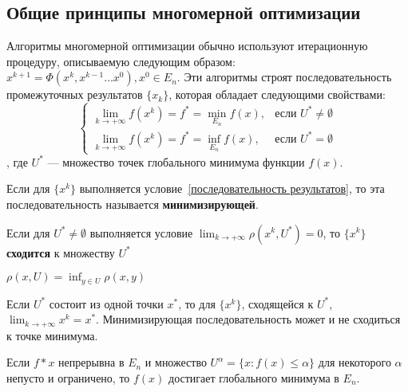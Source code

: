 \subsection{Общие принципы многомерной оптимизации}

Алгоритмы многомерной оптимизации обычно используют итерационную процедуру, описываемую следующим образом: \(x^{k + 1} = \Phi(x^k, x^{k - 1} \dots x^0), x^0 \in E_n\). Эти алгоритмы строят последовательность промежуточных результатов \(\{x_k\}\), которая обладает следующими свойствами:
\begin{equation}
    \begin{cases}
        \lim\limits_{k \to +\infty} f(x^k) = f^* = \min\limits_{E_n} f(x), & \text{если \(U^* \neq \emptyset\)} \\
        \lim\limits_{k \to +\infty} f(x^k) = f^* = \inf\limits_{E_n} f(x), & \text{если \(U^* = \emptyset\)}
    \end{cases}
    \label{последовательность результатов}
\end{equation}
, где \(U^*\) --- множество точек глобального минимума функции \(f(x)\).

\begin{definition}
    Если для \(\{x^k\} \) выполняется условие~\eqref{последовательность результатов}, то эта последовательность называется \textbf{минимизирующей}.
\end{definition}

\begin{definition}
    Если для \(U^* \neq \emptyset\) выполняется условие \(\lim_{k \to +\infty} \rho(x^k, U^*) = 0\), то \(\{x^k\}\) \textbf{сходится} к множеству \(U^*\)
\end{definition}

\begin{definition}
    \(\rho(x, U) = \inf_{y\in U} \rho(x, y)\)
\end{definition}

Если \(U^*\) состоит из одной точки \(x^*\), то для \(\{x^k\}\), сходящейся к \(U^*\), \(\lim_{k \to +\infty} x^k = x^*\). Минимизирующая последовательность может и не сходиться к точке минимума.

\begin{theorem}[Вейерштрасса]
    Если \(f*x\) непрерывна в \(E_n\) и множество \(U^\alpha = \{x : f(x) \leq \alpha\} \) для некоторого \(\alpha\) непусто и ограничено, то \(f(x)\) достигает глобального минимума в \(E_n\).
\end{theorem}


